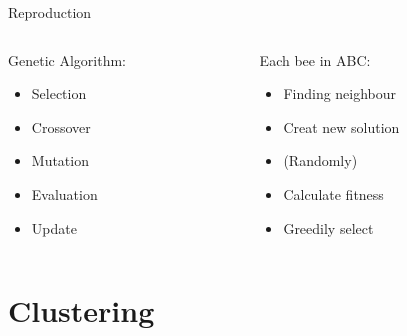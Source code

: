 \documentclass[14pt,ignorenonframetext,compress]{beamer}
\begin{document}
\begin{frame}{Reproduction}
\protect\hypertarget{reproduction}{}

\begin{columns}
\begin{column}{0.48\textwidth}

Genetic Algorithm:
\begin{itemize}
\item Selection
\item Crossover
\item Mutation
\item Evaluation
\item Update
\end{itemize}
\end{column}
\begin{column}{0.48\textwidth}

\pause

Each bee in ABC:
\begin{itemize}
\item Finding neighbour
\item Creat new solution
\item (Randomly)
\item Calculate fitness
\item Greedily select
\end{itemize}

\end{column}
\end{columns}

\end{frame}

\hypertarget{clustering}{%
\section{Clustering}\label{clustering}}
\end{document}
